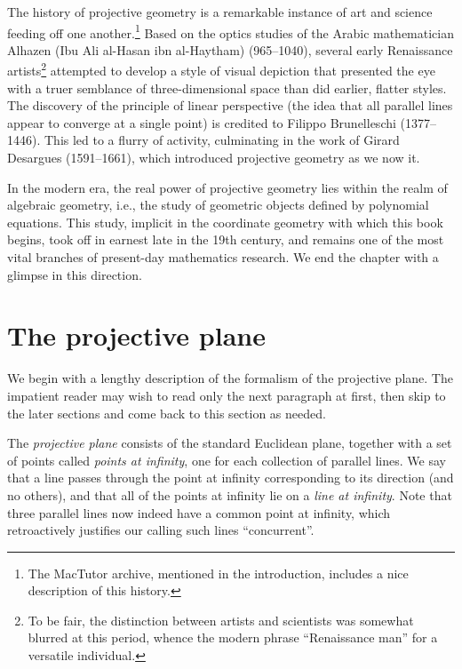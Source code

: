 \documentclass[12pt]{book}
\numberwithin{exc}{section}
\numberwithin{figure}{section}
\numberwithin{equation}{theorem}
\begin{document}
The history of projective geometry is a remarkable instance of art
and science feeding off one 
another.\footnote{The MacTutor archive, mentioned in the introduction,
includes a nice description of this history.}
Based on the optics studies of the Arabic mathematician
Alhazen (Ibu Ali al-Hasan ibn al-Haytham) (965--1040),
 
several early Renaissance artists\footnote{To be fair, the distinction
between artists and scientists was somewhat blurred at this period,
whence the modern phrase ``Renaissance man'' for a versatile individual.}
attempted to develop a style
of visual depiction that presented the eye with a truer semblance of
three-dimensional space than did earlier, flatter styles.
The discovery of the principle of linear perspective (the idea that
all parallel lines appear to converge at a single point) is credited
to Filippo Brunelleschi (1377--1446). 
This led to a flurry of activity, culminating in the work of
Girard Desargues (1591--1661),  which
introduced projective geometry as we now it.

In the modern era, the real power of projective geometry lies within
the realm of algebraic geometry, i.e.,
the study of geometric objects defined
by polynomial equations. This study, implicit in the coordinate
geometry with which this book begins, took off in earnest late in the 19th
century, and remains one of the most vital branches of present-day
mathematics research. We end the chapter with a glimpse in this direction.

\section{The projective plane}

We begin with a lengthy description of the formalism of the 
projective plane. The impatient reader may wish to read only the next 
paragraph at first, then skip to the later sections and come back to 
this section as needed.

The \emph{projective plane}  
consists of the standard Euclidean plane, 
together with a set of points called \emph{points at infinity}, 
 one 
for each collection of parallel lines. We say that a line passes 
through the point at infinity corresponding to its direction (and no 
others), and that all of the points at infinity lie on a \emph{line 
at infinity}. 
Note that three parallel lines now indeed have a common 
point at infinity, which retroactively justifies our calling such 
lines ``concurrent''.
\end{document}
